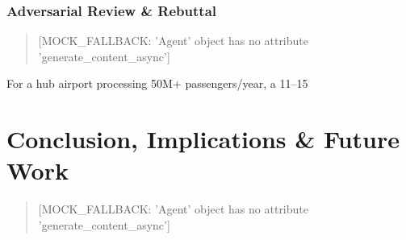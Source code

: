 \documentclass[11pt,a4paper]{report}
\begin{document}
\subsection{Adversarial Review \& Rebuttal}
\begin{quote}[MOCK_FALLBACK: 'Agent' object has no attribute 'generate_content_async']\end{quote}

\begin{tcolorbox}[colback=green!3!white,colframe=green!40!black,title=Business Impact Assessment]
For a hub airport processing 50M+ passengers/year, a 11–15%
\end{tcolorbox}
\clearpage


\chapter{Conclusion, Implications \& Future Work}
\begin{quote}[MOCK_FALLBACK: 'Agent' object has no attribute 'generate_content_async']\end{quote}

\end{document}
